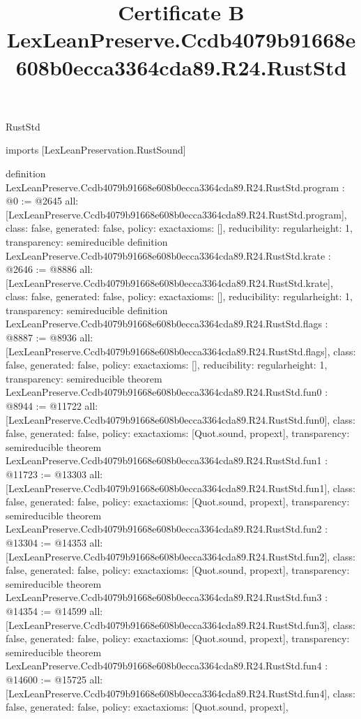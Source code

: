 \begin{lexlean}{RustStd}
\title{Certificate B LexLeanPreserve.Ccdb4079b91668e608b0ecca3364cda89.R24.RustStd}
\begin{coremodule}
imports [LexLeanPreservation.RustSound]

definition LexLeanPreserve.Ccdb4079b91668e608b0ecca3364cda89.R24.RustStd.program : @0 := @2645 {
  all: [LexLeanPreserve.Ccdb4079b91668e608b0ecca3364cda89.R24.RustStd.program],
  class: false,
  generated: false,
  policy: exact{axioms: []},
  reducibility: regular{height: 1},
  transparency: semireducible
}
definition LexLeanPreserve.Ccdb4079b91668e608b0ecca3364cda89.R24.RustStd.krate : @2646 := @8886 {
  all: [LexLeanPreserve.Ccdb4079b91668e608b0ecca3364cda89.R24.RustStd.krate],
  class: false,
  generated: false,
  policy: exact{axioms: []},
  reducibility: regular{height: 1},
  transparency: semireducible
}
definition LexLeanPreserve.Ccdb4079b91668e608b0ecca3364cda89.R24.RustStd.flags : @8887 := @8936 {
  all: [LexLeanPreserve.Ccdb4079b91668e608b0ecca3364cda89.R24.RustStd.flags],
  class: false,
  generated: false,
  policy: exact{axioms: []},
  reducibility: regular{height: 1},
  transparency: semireducible
}
theorem LexLeanPreserve.Ccdb4079b91668e608b0ecca3364cda89.R24.RustStd.fun0 : @8944 := @11722 {
  all: [LexLeanPreserve.Ccdb4079b91668e608b0ecca3364cda89.R24.RustStd.fun0],
  class: false,
  generated: false,
  policy: exact{axioms: [Quot.sound, propext]},
  transparency: semireducible
}
theorem LexLeanPreserve.Ccdb4079b91668e608b0ecca3364cda89.R24.RustStd.fun1 : @11723 := @13303 {
  all: [LexLeanPreserve.Ccdb4079b91668e608b0ecca3364cda89.R24.RustStd.fun1],
  class: false,
  generated: false,
  policy: exact{axioms: [Quot.sound, propext]},
  transparency: semireducible
}
theorem LexLeanPreserve.Ccdb4079b91668e608b0ecca3364cda89.R24.RustStd.fun2 : @13304 := @14353 {
  all: [LexLeanPreserve.Ccdb4079b91668e608b0ecca3364cda89.R24.RustStd.fun2],
  class: false,
  generated: false,
  policy: exact{axioms: [Quot.sound, propext]},
  transparency: semireducible
}
theorem LexLeanPreserve.Ccdb4079b91668e608b0ecca3364cda89.R24.RustStd.fun3 : @14354 := @14599 {
  all: [LexLeanPreserve.Ccdb4079b91668e608b0ecca3364cda89.R24.RustStd.fun3],
  class: false,
  generated: false,
  policy: exact{axioms: [Quot.sound, propext]},
  transparency: semireducible
}
theorem LexLeanPreserve.Ccdb4079b91668e608b0ecca3364cda89.R24.RustStd.fun4 : @14600 := @15725 {
  all: [LexLeanPreserve.Ccdb4079b91668e608b0ecca3364cda89.R24.RustStd.fun4],
  class: false,
  generated: false,
  policy: exact{axioms: [Quot.sound, propext]},
}
\end{coremodule}
\end{lexlean}
